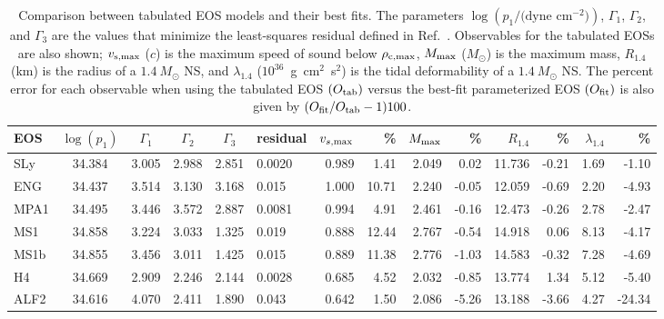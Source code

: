 \documentclass[twocolumn,prd,amssymb,aps,nofootinbib,showpacs,epsf]{revtex4}
\begin{document}
\begin{table}[!htb]
\begin{center}
\caption{
Comparison between tabulated EOS models and their best fits. The parameters $\log(p_1/\text{(dyne~cm$^{-2}$)})$, $\Gamma_1$, $\Gamma_2$, and $\Gamma_3$ are the values that minimize the least-squares residual defined in Ref.~\cite{ReadLackey2009}. Observables for the tabulated EOSs are also shown; $v_{\rm s,max}$ ($c$) is the maximum speed of sound below $\rho_{\rm c, max}$, $M_{\rm max}$ ($M_\odot$) is the maximum mass, $R_{1.4}$ (km) is the radius of a $1.4~M_\odot$ NS, and $\lambda_{1.4}$ ($10^{36}$~g~cm$^2$~s$^2$) is the tidal deformability of a $1.4~M_\odot$ NS. The percent error for each observable when using the tabulated EOS $(O_{\rm tab})$ versus the best-fit parameterized EOS $(O_{\rm fit})$ is also given by $(O_{\rm fit}/O_{\rm tab}-1)100$.
}
\begin{tabular}{l|ccccl|rr|rr|rr|rr}
\hline\hline
EOS & $\log(p_1)$ & $\Gamma_1$ & $\Gamma_2$ & $\Gamma_3$ & residual &
$v_{s, \rm max}$ & \% & $M_{\rm max}$ & \% & $R_{1.4}$ & \% & $\lambda_{1.4}$ & \% \\
\hline
SLy&34.384&3.005&2.988&2.851&0.0020& 0.989&1.41& 2.049&0.02& 11.736&-0.21&1.69&-1.10\\
ENG&34.437&3.514&3.130&3.168&0.015& 1.000&10.71& 2.240&-0.05& 12.059&-0.69&2.20&-4.93\\
MPA1&34.495&3.446&3.572&2.887&0.0081& 0.994&4.91& 2.461&-0.16& 12.473&-0.26&2.78&-2.47\\
MS1&34.858&3.224&3.033&1.325&0.019& 0.888&12.44& 2.767&-0.54& 14.918&0.06&8.13&-4.17\\
MS1b&34.855&3.456&3.011&1.425&0.015& 0.889&11.38& 2.776&-1.03& 14.583&-0.32&7.28&-4.69\\
H4&34.669&2.909&2.246&2.144&0.0028& 0.685&4.52& 2.032&-0.85& 13.774&1.34&5.12&-5.40\\
ALF2&34.616&4.070&2.411&1.890&0.043& 0.642&1.50& 2.086&-5.26& 13.188&-3.66&4.27&-24.34\\
\hline\hline
\end{tabular}
\label{tab:eosfit}
\end{center}
\end{table}
\end{document}
